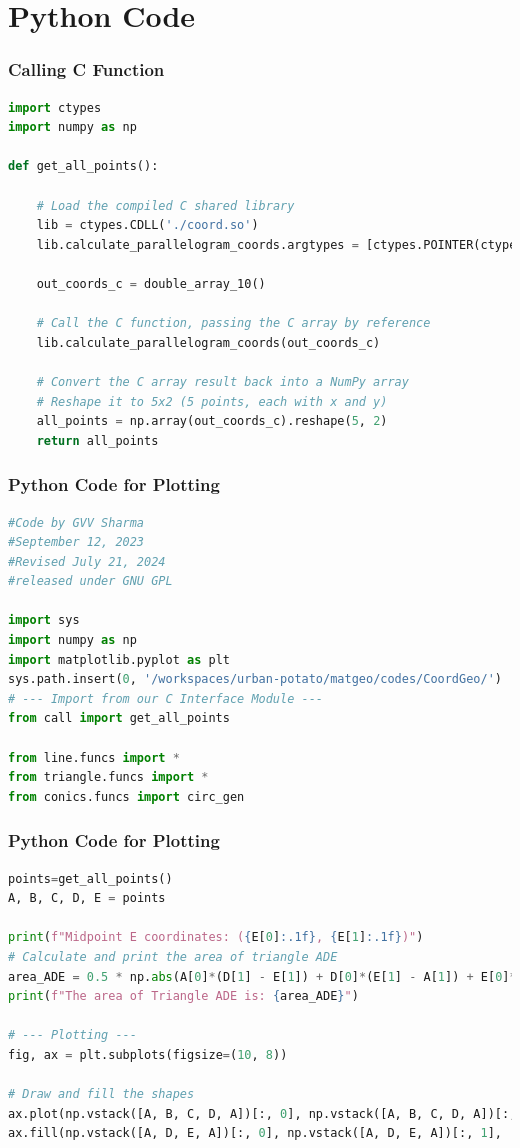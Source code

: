 \documentclass{beamer}
\theoremstyle{remark}
\numberwithin{equation}{section}
\begin{document}
\section{Python Code}
\begin{frame}[fragile]
\frametitle{Calling C Function}
\begin{lstlisting}[language=Python]
import ctypes
import numpy as np

def get_all_points():
  
    # Load the compiled C shared library
    lib = ctypes.CDLL('./coord.so')
    lib.calculate_parallelogram_coords.argtypes = [ctypes.POINTER(ctypes.c_double)]

    out_coords_c = double_array_10()

    # Call the C function, passing the C array by reference
    lib.calculate_parallelogram_coords(out_coords_c)

    # Convert the C array result back into a NumPy array
    # Reshape it to 5x2 (5 points, each with x and y)
    all_points = np.array(out_coords_c).reshape(5, 2)
    return all_points
\end{lstlisting}
\end{frame}

\begin{frame}[fragile]
\frametitle{Python Code for Plotting}
\begin{lstlisting}[language=Python]
#Code by GVV Sharma
#September 12, 2023
#Revised July 21, 2024
#released under GNU GPL

import sys
import numpy as np
import matplotlib.pyplot as plt
sys.path.insert(0, '/workspaces/urban-potato/matgeo/codes/CoordGeo/') 
# --- Import from our C Interface Module ---
from call import get_all_points

from line.funcs import *
from triangle.funcs import *
from conics.funcs import circ_gen

\end{lstlisting}
\end{frame}

\begin{frame}[fragile]
\frametitle{Python Code for Plotting}
\begin{lstlisting}[language=Python]
points=get_all_points()
A, B, C, D, E = points

print(f"Midpoint E coordinates: ({E[0]:.1f}, {E[1]:.1f})")
# Calculate and print the area of triangle ADE
area_ADE = 0.5 * np.abs(A[0]*(D[1] - E[1]) + D[0]*(E[1] - A[1]) + E[0]*(A[1] - D[1]))
print(f"The area of Triangle ADE is: {area_ADE}")

# --- Plotting ---
fig, ax = plt.subplots(figsize=(10, 8))

# Draw and fill the shapes
ax.plot(np.vstack([A, B, C, D, A])[:, 0], np.vstack([A, B, C, D, A])[:, 1], 'b-', label='Parallelogram ABCD')
ax.fill(np.vstack([A, D, E, A])[:, 0], np.vstack([A, D, E, A])[:, 1], 'lightgreen', alpha=0.6, label='Triangle ADE')
\end{lstlisting}
\end{frame}
\end{document}
